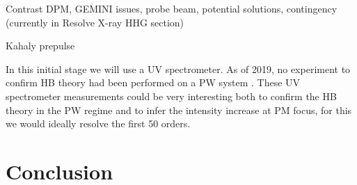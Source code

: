 Contrast DPM, GEMINI issues, probe beam, potential solutions, contingency (currently in Resolve X-ray HHG section)

Kahaly prepulse


In this initial stage we will use a UV spectrometer. As of 2019, no experiment to confirm HB theory had been performed on a PW system \cite{vincentiAchievingExtremeLight2019}. These UV spectrometer measurements could be very interesting both to confirm the HB theory in the PW regime and to infer the intensity increase at PM focus, for this we would ideally resolve the first 50 orders.
\section{Conclusion}





